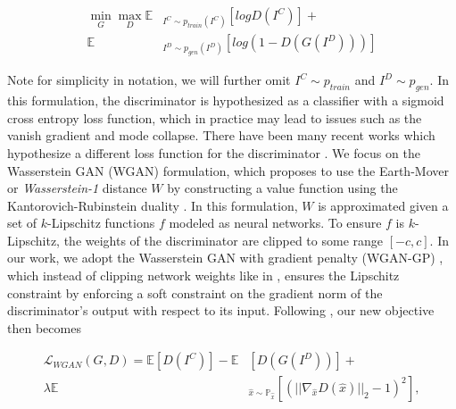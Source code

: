 \documentclass[conference,reqno]{IEEEtran}
\begin{document}
\begin{equation}
\begin{aligned}
   \min\limits_{G}\max\limits_{D} \mathbb{E} & _{I^C \sim p_{train}(I^C)} [logD(I^C)] + \\
   \mathbb{E} & _{I^D \sim p_{gen}(I^D)}[log(1 - D(G(I^D)))]
\end{aligned}
\end{equation}

\noindent Note for simplicity in notation, we will further omit $I^C \sim p_{train}$ and $I^D \sim p_{gen}$. In this
formulation, the discriminator is hypothesized as a classifier with a sigmoid cross entropy loss function, which in
practice may lead to issues such as the vanish gradient and mode collapse. There have been many recent works which
hypothesize a different loss function for the discriminator
\cite{mao2016least,arjovsky2017wasserstein,gulrajani2017improved,zhao2016energy}. We focus on the Wasserstein GAN
(WGAN) \cite{arjovsky2017wasserstein} formulation, which proposes to use the Earth-Mover or \textit{Wasserstein-1}
distance $W$ by constructing a value function using the Kantorovich-Rubinstein duality \cite{villani2008optimal}.
In this formulation, $W$ is approximated given a set of $k$-Lipschitz functions $f$ modeled as neural networks. To
ensure $f$ is $k$-Lipschitz, the weights of the discriminator are clipped to some range $[-c, c]$. In our work, we
adopt the Wasserstein GAN with gradient penalty (WGAN-GP) \cite{gulrajani2017improved}, which instead of clipping
network weights like in \cite{arjovsky2017wasserstein}, ensures the Lipschitz constraint by enforcing a soft
constraint on the gradient norm of the discriminator's output with respect to its input. Following
\cite{gulrajani2017improved}, our new objective then becomes

\begin{equation}
\begin{aligned}
   \mathcal{L}_{WGAN}(G,D) = \mathbb{E} [D(I^C)] - \mathbb{E} & [D(G(I^D))] + \\
   \lambda \mathbb{E} & _{\hat{x} \sim \mathbb{P}_{\hat{x}}} [(|| \nabla_{\hat{x}} D(\hat{x})||_2 -1)^2 ],
\end{aligned}
\end{equation}

\end{document}
